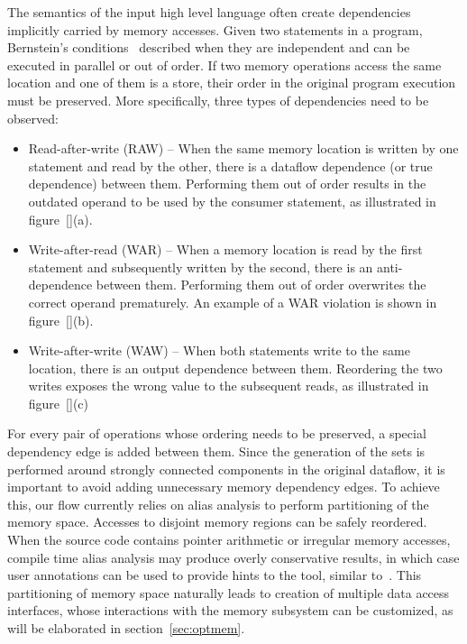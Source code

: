 The semantics of the input high level language often create
dependencies implicitly carried by memory accesses.
Given two statements in a program, Bernstein's conditions~\cite{4038883} described when
they are independent and can be executed in parallel or out of order.
If two memory operations access the same location and one of them is a store, their order in the original program execution must be preserved. More specifically, three types of dependencies need to be observed:
\begin{itemize}
    \item Read-after-write (RAW) -- When the same memory location is written by one statement and read by the other, there is a dataflow dependence (or true dependence) between them. Performing them out of order results in the outdated operand to be used by the consumer statement, as illustrated in 
    figure~\ref{}(a).
    \item Write-after-read (WAR) -- When a memory location is read by the first statement and subsequently written by the second, there is an anti-dependence between them. Performing them out of order overwrites
    the correct operand prematurely. An example of a WAR violation is shown in figure~\ref{}(b).
    \item Write-after-write (WAW) -- When both statements write to the same location, there is an output dependence between them. Reordering the two
    writes exposes the wrong value to the subsequent reads, as illustrated in
    figure~\ref{}(c)
\end{itemize}
 For every pair of operations whose ordering needs to be preserved, a special dependency edge is added between them. Since the generation of the sets is performed around strongly connected components in the original dataflow, it is important to avoid adding unnecessary memory dependency edges. To achieve this, our flow currently relies on alias analysis to perform partitioning of the memory space. Accesses to disjoint memory regions can be safely reordered. When the source code contains pointer arithmetic or irregular memory accesses, compile time alias analysis may produce overly conservative results, in which case user annotations can be used to provide hints to the tool, similar to~\cite{manycache}. This partitioning of memory space naturally leads to creation of multiple data access interfaces, whose interactions with the memory subsystem can be customized, as will be elaborated in section~\ref{sec:optmem}.

